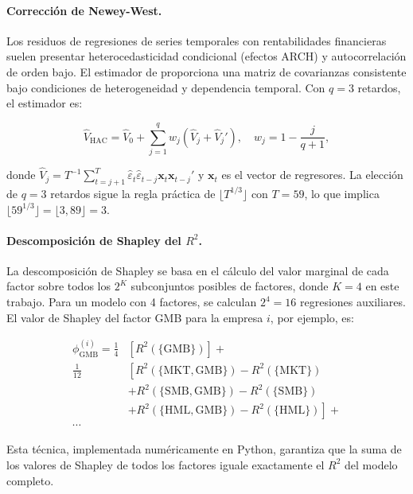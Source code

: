\documentclass[12pt, a4paper]{article}
\begin{document}
\paragraph{Correcci\'on de Newey-West.}
Los residuos de regresiones de series temporales con rentabilidades financieras suelen
presentar heterocedasticidad condicional (efectos ARCH) y autocorrelaci\'on de orden
bajo. El estimador de \textcite{neweywest1987} proporciona una matriz de covarianzas
consistente bajo condiciones de heterogeneidad y dependencia temporal. Con $q = 3$
retardos, el estimador es:

\begin{equation}
  \hat{V}_{\mathrm{HAC}} = \hat{V}_0 + \sum_{j=1}^{q} w_j
    \left( \hat{V}_j + \hat{V}_j' \right),
  \quad w_j = 1 - \frac{j}{q+1},
\end{equation}

donde $\hat{V}_j = T^{-1}\sum_{t=j+1}^{T} \hat\varepsilon_t \hat\varepsilon_{t-j}
\mathbf{x}_t \mathbf{x}_{t-j}'$ y $\mathbf{x}_t$ es el vector de regresores.
La elecci\'on de $q=3$ retardos sigue la regla pr\'actica de $\lfloor T^{1/3} \rfloor$
con $T=59$, lo que implica $\lfloor 59^{1/3} \rfloor = \lfloor 3{,}89 \rfloor = 3$.

\paragraph{Descomposici\'on de Shapley del $R^2$.}
La descomposici\'on de Shapley se basa en el c\'alculo del valor marginal de cada
factor sobre todos los $2^K$ subconjuntos posibles de factores, donde $K=4$ en este
trabajo. Para un modelo con 4 factores, se calculan $2^4 = 16$ regresiones auxiliares.
El valor de Shapley del factor GMB para la empresa $i$, por ejemplo, es:

\begin{align*}
  \phi_{\mathrm{GMB}}^{(i)} =
    \tfrac{1}{4}&\left[R^2(\{\mathrm{GMB}\})\right] + \\
    \tfrac{1}{12}&\left[R^2(\{\mathrm{MKT},\mathrm{GMB}\}) - R^2(\{\mathrm{MKT}\})\right. \\
    &\left. + R^2(\{\mathrm{SMB},\mathrm{GMB}\}) - R^2(\{\mathrm{SMB}\})\right. \\
    &\left. + R^2(\{\mathrm{HML},\mathrm{GMB}\}) - R^2(\{\mathrm{HML}\})\right] + \\
    \cdots
\end{align*}

Esta t\'ecnica, implementada num\'ericamente en Python, garantiza que la suma de los
valores de Shapley de todos los factores iguale exactamente el $R^2$ del modelo completo.
\end{document}
